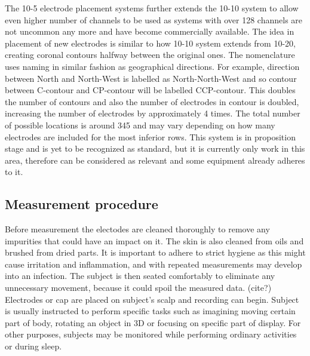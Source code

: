 The 10-5 electrode placement systems further extends the 10-10 system to allow
even higher number of channels to be used as systems with over 128 channels are
not uncommon any more and have become commercially available. The idea in
placement of new electrodes is similar to how 10-10 system extends from 10-20,
creating coronal contours halfway between the original ones. The nomenclature
uses naming in similar fashion as geographical directions. For example,
direction between North and North-West is labelled as North-North-West and so
contour between C-contour and CP-contour will be labelled CCP-contour.
This doubles the number of contours and also the number of electrodes in contour
is doubled, increasing the number of electrodes by approximately 4 times.
The total number of possible locations is around 345 and may vary depending on
how many electrodes are included for the most inferior rows. \cite{placeSys}
This system is in proposition stage and is yet to be recognized as standard, but
it is currently only work in this area, therefore can be considered as relevant
and some equipment already adheres to it.

\subsection{Measurement procedure}
Before measurement the electodes are cleaned thoroughly to remove any impurities
that could have an impact on it. The skin is also cleaned from oils and brushed
from dried parts. It is important to adhere to strict hygiene as this might
cause irritation and inflammation, and with repeated measurements may develop
into an infection.\cite{eegFund} The subject is then seated comfortably to
eliminate any unnecessary movement, because it could spoil the measured data.
(cite?) Electrodes or cap are placed on subject's scalp and recording can
begin. Subject is usually instructed to perform specific tasks such as imagining
moving certain part of body, rotating an object in 3D or focusing on specific
part of display. \cite{bcComm} For other purposes, subjects may be monitored
while performing ordinary activities or during sleep.


